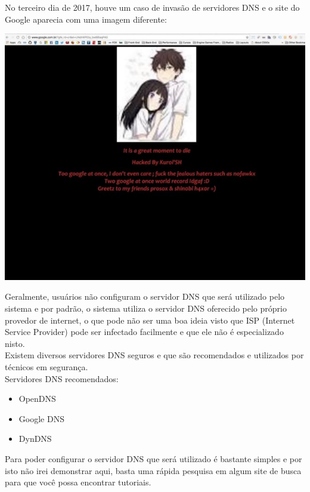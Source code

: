 \documentclass[12pt, letterpaper, DejaVuSansMono:12]{report}
\begin{document}
	No terceiro dia de 2017, houve um caso de invasão de servidores DNS e o site do Google aparecia com uma imagem diferente:

\begin{center} %
	\includegraphics[scale=0.7]{dns.jpg}\\
\end{center}

	Geralmente, usuários não configuram o servidor DNS que será utilizado pelo sistema e por padrão, o sistema utiliza o servidor DNS oferecido pelo próprio provedor de internet, o que pode não ser uma boa ideia visto que ISP (Internet Service Provider) pode ser infectado facilmente e que ele não é especializado nisto.\\


	Existem diversos servidores DNS seguros e que são recomendados e utilizados por técnicos em segurança.\\

	Servidores DNS recomendados:

	\begin{itemize} %
		\item OpenDNS
		\item Google DNS
		\item DynDNS
%
	\end{itemize} %

	Para poder configurar o servidor DNS que será utilizado é bastante simples e por isto não irei demonstrar aqui, basta uma rápida pesquisa em algum site de busca para que você possa encontrar tutoriais.\\
\end{document}
